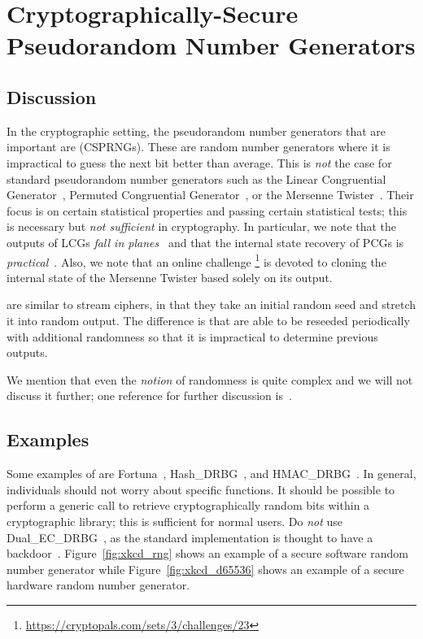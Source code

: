 \section{Cryptographically-Secure Pseudorandom Number Generators}
\label{sec:csprng}

\subsection{Discussion}

In the cryptographic setting, the pseudorandom number generators
that are important are
\emph{}
(CSPRNGs).
These are random number generators where it is impractical
to guess the next bit better than average.
This is \emph{not} the case for standard pseudorandom number generators
such as the Linear Congruential Generator~\cite[Chapter 3.2.1]{TAOCP2},
Permuted Congruential Generator~\cite{PCG2014},
or the Mersenne Twister~\cite{matsumoto1998mersenne}.
Their focus is on certain statistical properties and passing
certain statistical tests;
this is necessary but \emph{not sufficient} in cryptography.
In particular, we note that the outputs of LCGs
\emph{fall in planes}~\cite{marsaglia1968random}
and that the internal state recovery of PCGs
is \emph{practical}~\cite{bouillaguet2020practical}.
Also, we note that an online challenge%
\footnote{\url{https://cryptopals.com/sets/3/challenges/23}}
is devoted to cloning the internal state of the Mersenne Twister
based solely on its output.

 are similar to \glspl{stream cipher}, in that they take
an initial random seed and stretch it into random output.
The difference is that  are able to be reseeded
periodically with additional randomness
so that it is impractical to determine previous outputs.

We mention that even the \emph{notion} of randomness is quite complex
and we will not discuss it further;
one reference for further discussion is~\cite[Chapter 3.5]{TAOCP2}.

\subsection{Examples}

Some examples of  are
Fortuna~\cite[Chapter 10]{PracticalCryptography}\cite[Chapter 9]{CryptoEng},
Hash\_DRBG~\cite[Section~10.1.1]{NIST-SP-800-90ARev1},
and HMAC\_DRBG~\cite[Section~10.1.2]{NIST-SP-800-90ARev1}.
In general, individuals should not worry about specific
 functions.
It should be possible to perform a generic call to retrieve
cryptographically random bits within a cryptographic library;
this is sufficient for normal users.
Do \emph{not} use Dual\_EC\_DRBG~\cite[Section~10.3.1]{NIST-SP-800-90A},
as the standard implementation
is thought to have a backdoor~\cite{BernsteinDualEC}.
Figure~\ref{fig:xkcd_rng} shows an example of a
secure software random number generator
while Figure~\ref{fig:xkcd_d65536} shows an example of a
secure hardware random number generator.

